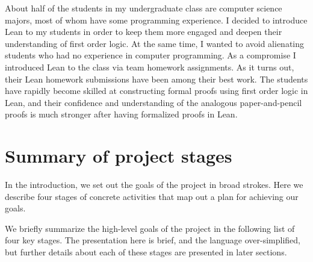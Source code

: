 \documentclass[12pt]{amsart}  %
\begin{document}
About half of the students in my undergraduate class are computer science majors,
most of whom have some programming experience.
I decided to introduce Lean to my students in order to keep them more
engaged and deepen their understanding of first order logic.
At the same time, I wanted to avoid alienating students who had no experience 
in computer programming.
As a compromise I introduced Lean to the class via team homework
assignments. As it turns out, their Lean homework submissions have been 
among their best work. The students have rapidly become skilled at constructing 
formal proofs using first order logic in Lean, and their confidence and
understanding of the analogous paper-and-pencil proofs is much stronger
after having formalized proofs in Lean.


\section{Summary of project stages}


In the introduction, we set out the goals of the project in broad strokes. 
Here we describe four stages of concrete activities that map out a plan for 
achieving our goals.



We briefly summarize the high-level goals of the project
in the following list of four key stages. The presentation here is brief, and the language
over-simplified, but further details about each of these stages are presented in later sections.
\end{document}
